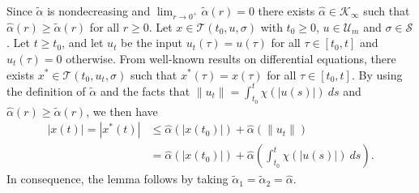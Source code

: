 \documentclass[9pt,final,journal]{IEEEtran}
\def\K{\mathcal{K}}
\def\Ki{\K_{\infty}}
\def\S{\mathcal{S}}
\def\T{\mathcal{T}}
\def\U{\mathcal{U}}
\begin{document}
Since $\tilde \alpha$ is nondecreasing and
$\lim_{r\to 0^+}\tilde \alpha(r)=0$ there exists $\hat \alpha \in \Ki$ such
that $\hat \alpha(r)\ge \tilde \alpha(r)$ for all $r\ge 0$. Let
$x \in \T(t_0,u,\sigma)$ with $t_0\ge 0$, $u\in \U_m$ and
$\sigma\in \S$. Let $t\ge t_0$, and let $u_t$ be the input $u_t(\tau)=u(\tau)$
for all $\tau \in [t_0,t]$ and $u_t(\tau)=0$ otherwise. From
well-known results on differential equations, there exists
$x^*\in \T(t_0,u_t,\sigma)$ such that $x^*(\tau)=x(\tau)$ for all
$\tau \in [t_0,t]$. By using the definition of $\tilde \alpha$ and the
facts that $\|u_t\|=\int_{t_0}^t\chi(|u(s)|)\:ds$ and
$\hat \alpha(r)\ge \tilde \alpha(r)$, we then have
\begin{align*}
  |x(t)|=|x^*(t)| &\le \hat \alpha(|x(t_0)|)+ \hat \alpha\left (\|u_t\|\right )\\
  &= \hat \alpha(|x(t_0)|)+\hat \alpha \left (\int_{t_0}^t\chi(|u(s)|)\:ds \right ).
\end{align*}
In consequence, the lemma follows by taking
$\tilde \alpha_1=\tilde \alpha_2 =\hat \alpha$.\hfill\QED
\end{document}
